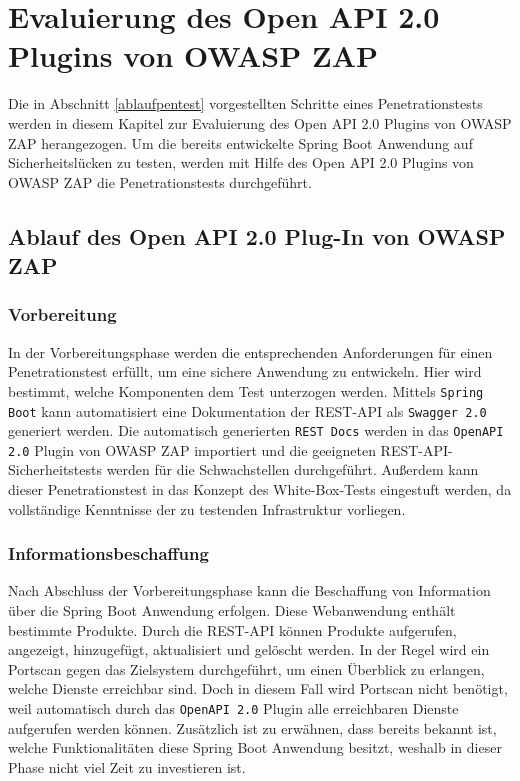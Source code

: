 \chapter{Evaluierung des Open API 2.0 Plugins von OWASP ZAP}
\label{cha:k5}

Die in Abschnitt \ref{ablaufpentest} vorgestellten Schritte eines Penetrationstests werden in diesem Kapitel zur Evaluierung des Open API 2.0 Plugins von OWASP ZAP herangezogen. Um die bereits entwickelte Spring Boot Anwendung auf Sicherheitslücken zu testen, werden mit Hilfe des Open API 2.0 Plugins von OWASP ZAP die Penetrationstests durchgeführt.

\section{Ablauf des Open API 2.0 Plug-In von OWASP ZAP}

\subsection{Vorbereitung}

In der Vorbereitungsphase werden die entsprechenden Anforderungen für einen Penetrationstest erfüllt, um eine sichere Anwendung zu entwickeln. Hier wird bestimmt, welche Komponenten dem Test unterzogen werden. Mittels \texttt{Spring Boot} kann automatisiert eine Dokumentation der REST-API als \texttt{Swagger 2.0} generiert werden. Die automatisch generierten \texttt{REST Docs} werden in das \texttt{OpenAPI 2.0} Plugin von OWASP ZAP importiert und die geeigneten REST-API-Sicherheitstests werden für die Schwachstellen durchgeführt. Außerdem kann dieser Penetrationstest in das Konzept des White-Box-Tests eingestuft werden, da vollständige Kenntnisse der zu testenden Infrastruktur vorliegen.

\subsection{Informationsbeschaffung}

Nach Abschluss der Vorbereitungsphase kann die Beschaffung von Information über die Spring Boot Anwendung erfolgen. Diese Webanwendung enthält bestimmte Produkte. Durch die REST-API können Produkte aufgerufen, angezeigt, hinzugefügt, aktualisiert und gelöscht werden. In der Regel wird ein Portscan gegen das Zielsystem durchgeführt, um einen Überblick zu erlangen, welche Dienste erreichbar sind. Doch in diesem Fall wird Portscan nicht benötigt, weil automatisch durch das \texttt{OpenAPI 2.0} Plugin alle erreichbaren Dienste aufgerufen werden können. Zusätzlich ist zu erwähnen, dass bereits bekannt ist, welche Funktionalitäten diese Spring Boot Anwendung besitzt, weshalb in dieser Phase nicht viel Zeit zu investieren ist.

